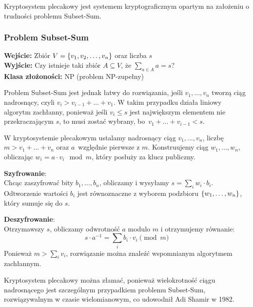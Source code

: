 Kryptosystem plecakowy jest systemem kryptograficznym opartym na założeniu o trudności problemu Subset-Sum.

\subsubsection*{Problem Subset-Sum}
\textbf{Wejście:} Zbiór \( V = \set{v_1, v_2, \dots, v_n} \) oraz liczba \( s \) \\
\textbf{Wyjście:} Czy istnieje taki zbiór \( A \subseteq V \), że \( \sum_{a \in A} a = s \)? \\
\textbf{Klasa złożoności:} NP (problem NP-zupełny)

Problem Subset-Sum jest jednak łatwy do rozwiązania, jeśli \( v_1, \dots, v_n \) tworzą ciąg nadrosnący, czyli \( v_i > v_{i-1} + \ldots + v_1 \).
W takim przypadku działa liniowy algorytm zachłanny, ponieważ jeśli \( v_i \leq s \) jest największym elementem nie przekraczającym \( s \), to musi zostać wybrany, bo~\( v_1 + \ldots + v_{i-1} < s \).

W kryptosystemie plecakowym ustalamy nadrosnący ciąg \( v_1, \dots, v_n \), liczbę \( m > v_1 + \ldots + v_n \) oraz \( a \)~względnie pierwsze z \( m \).
Konstruujemy ciąg \( w_1, \dots, w_n \), obliczając \( w_i = a \cdot v_i \mod m \), który posłuży za klucz publiczny.

\textbf{Szyfrowanie}: \\
Chcąc zaszyfrować bity \( b_1, \dots, b_n \), obliczamy i wysyłamy \( s = \sum_i w_i \cdot b_i \). Odtworzenie wartości \( b_i \) jest równoznaczne z wyborem podzbioru \( \set{w_1, \ldots, w_n} \), który sumuje się do \( s \).

\textbf{Deszyfrowanie}: \\
Otrzymawszy \( s \), obliczamy odwrotność \( a \) modulo \( m \) i otrzymujemy równanie:
\[
	s \cdot a^{-1} = \sum_i b_i \cdot v_i \pmod{m}
\]
Ponieważ \( m > \sum_i v_i \), rozwiązanie można znaleźć wspomnianym algorytmem zachłannym.

Kryptosystem plecakowy można złamać, ponieważ wielokrotność ciągu nadrosnącego jest szczególnym przypadkiem problemu Subset-Sum, rozwiązywalnym w czasie wielomianowym, co udowodnił Adi Shamir w 1982.
